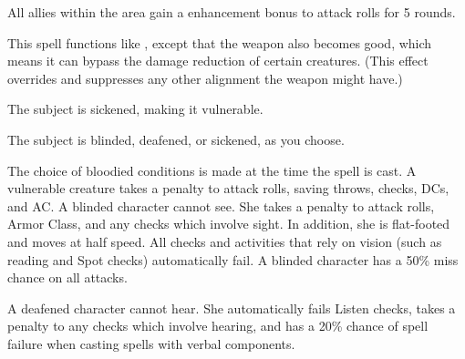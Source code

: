 \begin{spelleffect}
  All allies within the area gain a  enhancement bonus to attack rolls for 5 rounds. \bonusscalingdescription
\end{spelleffect}

\begin{spelleffect}
  This spell functions like , except that the weapon also becomes good, which means it can bypass the damage reduction of certain creatures. (This effect overrides and suppresses any other alignment the weapon might have.)
\end{spelleffect}

\begin{spellhealthy}
  The subject is sickened, making it vulnerable.
\end{spellhealthy}
\begin{spellblood}
  The subject is blinded, deafened, or sickened, as you choose.
\end{spellblood}
\begin{spellnotes}
   The choice of bloodied conditions is made at the time the spell is cast. A vulnerable creature takes a  penalty to attack rolls, saving throws, checks, DCs, and AC. A blinded character cannot see. She takes a  penalty to attack rolls, Armor Class, and any checks which involve sight. In addition, she is flat-footed and moves at half speed. All checks and activities that rely on vision (such as reading and Spot checks) automatically fail. A blinded character has a 50\% miss chance on all attacks.

  A deafened character cannot hear. She automatically fails Listen checks, takes a  penalty to any checks which involve hearing, and has a 20\% chance of spell failure when casting spells with verbal components.
  

\end{spellnotes}

